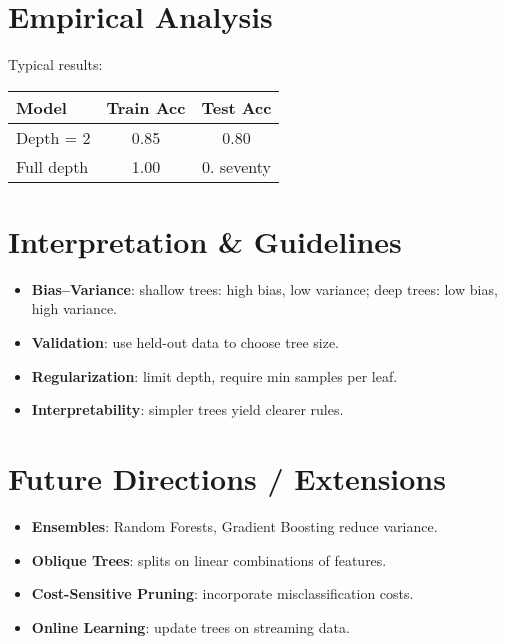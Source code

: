 \documentclass[11pt]{article}
\begin{document}
\section{Empirical Analysis}
Typical results:
\begin{tabular}{lcc}
\hline
Model & Train Acc & Test Acc \\
\hline
Depth = 2 & 0.85 & 0.80 \\
Full depth & 1.00 & 0. seventy \\
\hline
\end{tabular}

\section{Interpretation \& Guidelines}
\begin{itemize}
  \item \textbf{Bias--Variance}: shallow trees: high bias, low variance; deep trees: low bias, high variance.
  \item \textbf{Validation}: use held-out data to choose tree size.
  \item \textbf{Regularization}: limit depth, require min samples per leaf.
  \item \textbf{Interpretability}: simpler trees yield clearer rules.
\end{itemize}

\section{Future Directions / Extensions}
\begin{itemize}
  \item \textbf{Ensembles}: Random Forests, Gradient Boosting reduce variance.
  \item \textbf{Oblique Trees}: splits on linear combinations of features.
  \item \textbf{Cost-Sensitive Pruning}: incorporate misclassification costs.
  \item \textbf{Online Learning}: update trees on streaming data.
\end{itemize}
\end{document}
